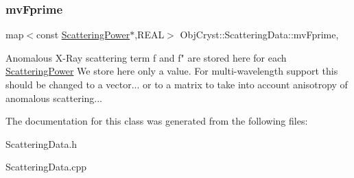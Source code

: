 \subsubsection{\texorpdfstring{mvFprime}{mvFprime}}
{\footnotesize\ttfamily map$<$const \mbox{\hyperlink{class_obj_cryst_1_1_scattering_power}{Scattering\+Power}}$\ast$,R\+E\+AL$>$ Obj\+Cryst\+::\+Scattering\+Data\+::mv\+Fprime\hspace{0.3cm}{\ttfamily [mutable]}, {\ttfamily [protected]}}

Anomalous X-\/\+Ray scattering term f\textquotesingle{} and f" are stored here for each \mbox{\hyperlink{class_obj_cryst_1_1_scattering_power}{Scattering\+Power}} We store here only a value. For multi-\/wavelength support this should be changed to a vector... or to a matrix to take into account anisotropy of anomalous scattering... 

The documentation for this class was generated from the following files\+:\begin{DoxyCompactItemize}
\item 
Scattering\+Data.\+h\item 
Scattering\+Data.\+cpp\end{DoxyCompactItemize}
